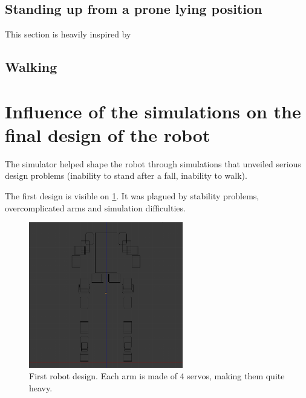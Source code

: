\subsection{Standing up from a prone lying position}
This section is heavily inspired by \cite{Stuckler06}

\subsection{Walking}

\section{Influence of the simulations on the final design of the robot}
The simulator helped shape the robot through simulations that unveiled serious design problems (inability to stand after a fall, inability to walk).

The first design is visible on \cref{fig:first_robot}. It was plagued by stability problems, overcomplicated arms and simulation difficulties. 
\begin{figure}[htp]
\center
\includegraphics[width=0.6\textwidth]{figures/robot1}
\caption[Initial robot design]{First robot design. Each arm is made of 4 servos, making them quite heavy.}
\label{fig:first_robot}
\end{figure}

